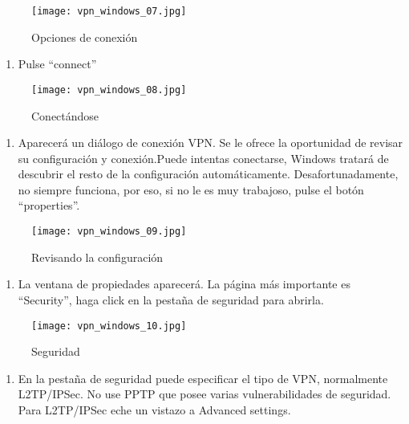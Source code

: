 \documentclass[10pt,a5paper,twoside,,]{book}
\providecommand{\tightlist}{%
  \setlength{\itemsep}{0pt}\setlength{\parskip}{0pt}}
\begin{document}
\begin{figure}[htbp]
\centering
\texttt{[image: vpn\_windows\_07.jpg]}
\caption{Opciones de conexión}
\end{figure}

\begin{enumerate}
\def\labelenumi{\arabic{enumi}.}
\setcounter{enumi}{8}
\tightlist
\item
  Pulse ``connect''
\end{enumerate}

\begin{figure}[htbp]
\centering
\texttt{[image: vpn\_windows\_08.jpg]}
\caption{Conectándose}
\end{figure}

\begin{enumerate}
\def\labelenumi{\arabic{enumi}.}
\setcounter{enumi}{9}
\tightlist
\item
  Aparecerá un diálogo de conexión VPN. Se le ofrece la oportunidad de
  revisar su configuración y conexión.Puede intentas conectarse, Windows
  tratará de descubrir el resto de la configuración automáticamente.
  Desafortunadamente, no siempre funciona, por eso, si no le es muy
  trabajoso, pulse el botón ``properties''.
\end{enumerate}

\begin{figure}[htbp]
\centering
\texttt{[image: vpn\_windows\_09.jpg]}
\caption{Revisando la configuración}
\end{figure}

\begin{enumerate}
\def\labelenumi{\arabic{enumi}.}
\setcounter{enumi}{10}
\tightlist
\item
  La ventana de propiedades aparecerá. La página más importante es
  ``Security'', haga click en la pestaña de seguridad para abrirla.
\end{enumerate}

\begin{figure}[htbp]
\centering
\texttt{[image: vpn\_windows\_10.jpg]}
\caption{Seguridad}
\end{figure}

\begin{enumerate}
\def\labelenumi{\arabic{enumi}.}
\setcounter{enumi}{11}
\tightlist
\item
  En la pestaña de seguridad puede especificar el tipo de VPN,
  normalmente L2TP/IPSec. No use PPTP que posee varias vulnerabilidades
  de seguridad. Para L2TP/IPSec eche un vistazo a Advanced settings.
\end{enumerate}
\end{document}
